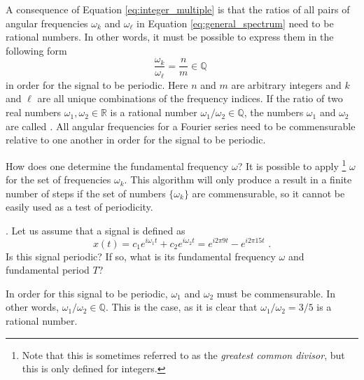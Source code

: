 A consequence of Equation \ref{eq:integer_multiple} is that the ratios of all pairs of angular frequencies $\omega_k$ and $\omega_{\ell}$ 
in Equation \ref{eq:general_spectrum} need to be rational numbers. In other words, it must be possible to express them in the following form
\begin{equation}
\frac{\omega_k}{\omega_{\ell}} = \frac{n}{m} \in \mathbb{Q} \,\,
\end{equation}
in order for the signal to be periodic. Here $n$ and $m$ are arbitrary integers and $k$ and $\ell$ are all unique combinations of the frequency indices. 
If the ratio of two real numbers $\omega_1,\omega_2\in\mathbb{R}$ is a rational number $\omega_1/\omega_2 \in \mathbb{Q}$, the numbers $\omega_1$ and 
$\omega_2$ are called \emph{.} All angular frequencies for a Fourier series need to be commensurable relative to one another in order for the signal to be periodic.

How does one determine the fundamental frequency $\omega$? It is possible to apply \emph{}\footnote{Note that this is sometimes referred to as the \emph{greatest common divisor}, but this is only defined for
integers.} $\omega$ for the set of frequencies $\omega_k$. This algorithm will only produce a result in a finite number of steps if the set of numbers $\{\omega_k\}$ are commensurable, so it cannot be easily used as a test of periodicity.

. Let us assume that a signal is defined as 
\begin{equation}
x(t) = c_1 e^{i \omega_1 t} + c_2 e^{i \omega_2 t} = e^{i 2\pi 9t}
- e^{i 2\pi 15t} \,\,.
\end{equation}
Is this signal periodic? If so, what is its fundamental frequency $\omega$ and fundamental period $T$?

In order for this signal to be periodic, $\omega_1$ and $\omega_2$ must be commensurable. In other words, $\omega_1/\omega_2 \in \mathbb{Q}$. This is the case, as it is clear that $\omega_1/\omega_2 = 3/5$ is a rational number.

